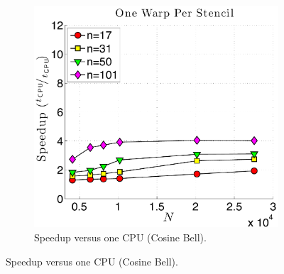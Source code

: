 \begin{figure}
\begin{subfigure}[t]{0.425\textwidth}
\includegraphics[width=\textwidth]{../figures/keeneland_results/alltoallv_cosine/speedup_1proc_oneWarpPerStencil.pdf}
\caption{Speedup versus one CPU (Cosine Bell).}
\label{fig:speedup_1proc_oneWarp_keeneland_cosine}
\end{subfigure} 


\end{figure}
